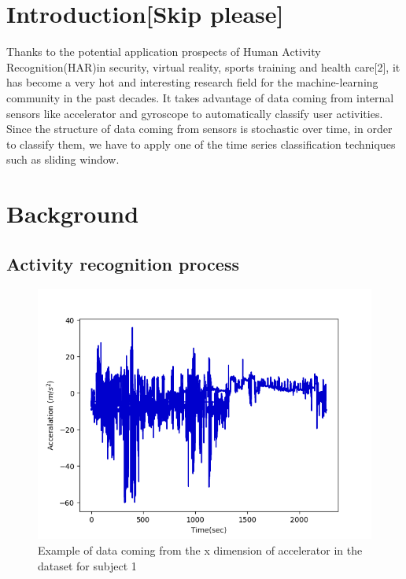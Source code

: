 \section{Introduction[Skip please]}
Thanks to the potential application prospects of Human Activity Recognition(HAR)in security, virtual reality, sports training and health care[2], it has become a very hot and interesting research field for the machine-learning community in the past decades. It takes advantage of data coming from internal sensors like accelerator and gyroscope to automatically classify user activities. Since the structure of data coming from sensors is stochastic over time, in order to classify them, we have to apply one of the time series classification techniques such as sliding window.

\section{Background}
\subsection{Activity recognition process}\label{subsec:ARP}

\begin{figure}[h]
    \centering
    \includegraphics[width=.4\textwidth]{Figures/signal.png}
    \caption{Example of data coming from the x dimension of accelerator in the dataset for subject 1  }
    \label{fig:signal}
\end{figure}


